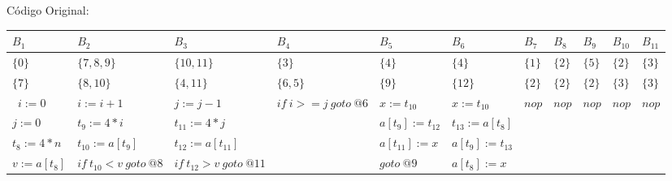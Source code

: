 C\'odigo Original:

\begin{table}[ht]
\begin{scriptsize}
\begin{tabular}{l|l|l|l|l|l|l|l|l|l|l}
$B_{1}$ & $B_{2}$ & $B_{3}$ & $B_{4}$ & $B_{5}$ & $B_{6}$ & $B_{7}$ & $B_{8}$ & $B_{9}$ & $B_{10}$ & $B_{11}$ \\
\hline
$\{0\}$ & $\{7, 8, 9\}$ & $\{10, 11\}$ & $\{3\}$ & $\{4\}$ & $\{4\}$ & $\{1\}$ & $\{2\}$ & $\{5\}$ & $\{2\}$ & $\{3\}$ \\
$\{7\}$ & $\{8, 10\}$ & $\{4, 11\}$ & $\{6, 5\}$ & $\{9\}$ & $\{12\}$ & $\{2\}$ & $\{2\}$ & $\{2\}$ & $\{3\}$ & $\{3\}$ \\
\hline\
$i:=0$ & $i:=i+1$ & $j:=j-1$ & $if\:i>=j\:goto\:@6$ & $x:=t_{10}$ & $x:=t_{10}$ & $nop$ & $nop$ & $nop$ & $nop$ & $nop$ \\
$j:=0$ & $t_{9}:=4*i$ & $t_{11}:=4*j$ &  & $a[t_{9}]:=t_{12}$ & $t_{13}:=a[t_{8}]$ &  &  &  &  &  \\
$t_{8}:=4*n$ & $t_{10}:=a[t_{9}]$ & $t_{12}:=a[t_{11}]$ &  & $a[t_{11}]:=x$ & $a[t_{9}]:=t_{13}$ &  &  &  &  &  \\
$v:=a[t_{8}]$ & $if\:t_{10}<v\:goto\:@8$ & $if\:t_{12}>v\:goto\:@11$ &  & $goto\:@9$ & $a[t_{8}]:=x$ &  &  &  &  &  \\
\end{tabular}
\end{scriptsize}
\end{table}

